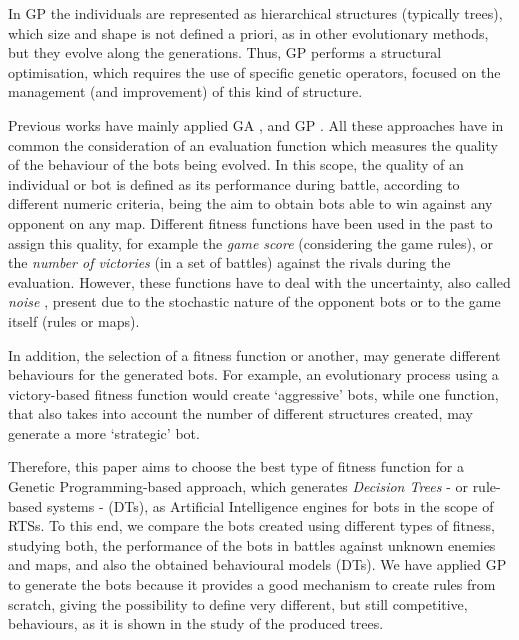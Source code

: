 \documentclass[preprint]{elsarticle}
\begin{document}
In GP the individuals are represented as hierarchical structures (typically trees), which size and shape is not defined a priori, as in other evolutionary methods, but they evolve along the generations. Thus, GP performs a structural optimisation, which requires the use of specific genetic operators, focused on the management (and improvement) of this kind of structure.

Previous works have mainly applied GA \cite{Genebot_CEC11,ExpGenebot_CIG2012,Barriga2014:BuildingOrder_GA}, and GP \cite{bistrom_GP_StarCraft,Garcia14Treedepth,Garcia15Starcraft}. 
All these approaches have in common the consideration of an evaluation function which measures the quality of the behaviour of the bots being evolved. 
In this scope, the quality of an individual or bot is defined as its performance during battle, according to different numeric criteria, being the aim to obtain bots able to win against any opponent on any map.
Different fitness functions have been used in the past to assign this quality, for example the {\em game score} (considering the game rules), or the {\em number of victories} (in a set of battles) against the rivals during the evaluation. 
However, these functions have to deal with the uncertainty, also called {\em noise} \cite{merelo14:noisy,merelo15:uncertainty}, present due to the stochastic nature of the opponent bots or to the game itself (rules or maps). 

In addition, the selection of a fitness function or another, may generate different behaviours for the generated bots. For example, an evolutionary process using a victory-based fitness function would create `aggressive' bots, while one function, that also takes into account the number of different structures created, may generate a more `strategic' bot. 

Therefore, this paper aims to choose the best type of fitness function for a Genetic Programming-based approach, which generates {\em Decision Trees} - or rule-based systems - (DTs), as Artificial Intelligence engines for bots in the scope of RTSs.
To this end, we compare the bots created using different types of fitness, studying both, the performance of the bots in battles against unknown enemies and maps, and also the obtained behavioural models (DTs). 
We have applied GP to generate the bots because it provides a good mechanism to create rules from scratch, giving the possibility to define very different, but still competitive, behaviours, as it is shown in the study of the produced trees. 
\end{document}
